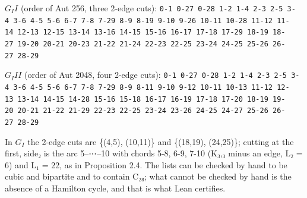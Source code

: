 \documentclass[11pt,a4paper]{article}
\theoremstyle{named}
\begin{document}
\textbf{$G_II$} (order of Aut 256, three 2-edge cuts): \texttt{0-1\ \allowbreak{}0-27\ \allowbreak{}0-28\ \allowbreak{}1-2\ \allowbreak{}1-4\ \allowbreak{}2-3\ \allowbreak{}2-5\ \allowbreak{}3-4\ \allowbreak{}3-6\ \allowbreak{}4-5\ \allowbreak{}5-6\ \allowbreak{}6-7\ \allowbreak{}7-8\ \allowbreak{}7-29\ \allowbreak{}8-9\ \allowbreak{}8-19\ \allowbreak{}9-10\ \allowbreak{}9-26\ \allowbreak{}10-11\ \allowbreak{}10-28\ \allowbreak{}11-12\ \allowbreak{}11-14\ \allowbreak{}12-13\ \allowbreak{}12-15\ \allowbreak{}13-14\ \allowbreak{}13-16\ \allowbreak{}14-15\ \allowbreak{}15-16\ \allowbreak{}16-17\ \allowbreak{}17-18\ \allowbreak{}17-29\ \allowbreak{}18-19\ \allowbreak{}18-27\ \allowbreak{}19-20\ \allowbreak{}20-21\ \allowbreak{}20-23\ \allowbreak{}21-22\ \allowbreak{}21-24\ \allowbreak{}22-23\ \allowbreak{}22-25\ \allowbreak{}23-24\ \allowbreak{}24-25\ \allowbreak{}25-26\ \allowbreak{}26-27\ \allowbreak{}28-29}

\textbf{$G_III$} (order of Aut 2048, four 2-edge cuts): \texttt{0-1\ \allowbreak{}0-27\ \allowbreak{}0-28\ \allowbreak{}1-2\ \allowbreak{}1-4\ \allowbreak{}2-3\ \allowbreak{}2-5\ \allowbreak{}3-4\ \allowbreak{}3-6\ \allowbreak{}4-5\ \allowbreak{}5-6\ \allowbreak{}6-7\ \allowbreak{}7-8\ \allowbreak{}7-29\ \allowbreak{}8-9\ \allowbreak{}8-11\ \allowbreak{}9-10\ \allowbreak{}9-12\ \allowbreak{}10-11\ \allowbreak{}10-13\ \allowbreak{}11-12\ \allowbreak{}12-13\ \allowbreak{}13-14\ \allowbreak{}14-15\ \allowbreak{}14-28\ \allowbreak{}15-16\ \allowbreak{}15-18\ \allowbreak{}16-17\ \allowbreak{}16-19\ \allowbreak{}17-18\ \allowbreak{}17-20\ \allowbreak{}18-19\ \allowbreak{}19-20\ \allowbreak{}20-21\ \allowbreak{}21-22\ \allowbreak{}21-29\ \allowbreak{}22-23\ \allowbreak{}22-25\ \allowbreak{}23-24\ \allowbreak{}23-26\ \allowbreak{}24-25\ \allowbreak{}24-27\ \allowbreak{}25-26\ \allowbreak{}26-27\ \allowbreak{}28-29}

In $G_I$ the 2-edge cuts are \{(4,5), (10,11)\} and \{(18,19), (24,25)\}; cutting at the first, side₂ is the arc 5–⋯–10 with chords 5-8, 6-9, 7-10 (K₃,₃ minus an edge, L₂ = 6) and L₁ = 22, as in Proposition 2.4. The lists can be checked by hand to be cubic and bipartite and to contain C₂₈; what cannot be checked by hand is the absence of a Hamilton cycle, and that is what Lean certifies.
\end{document}
